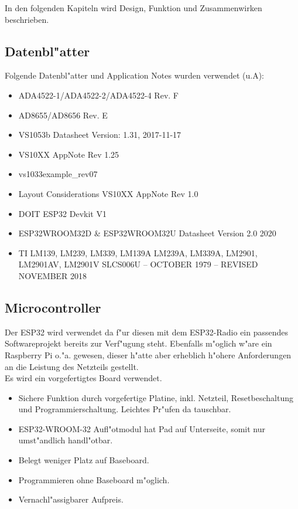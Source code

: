 \documentclass[ngerman,11pt,parskip=half] {scrartcl}
\begin{document}
In den folgenden Kapiteln wird Design, Funktion und Zusammenwirken beschrieben.

\subsection{Datenbl"atter} \label{sec:schaltung:datenblaetter}

Folgende Datenbl"atter und Application Notes wurden verwendet (u.A):
\begin{itemize}
\item ADA4522-1/ADA4522-2/ADA4522-4 Rev. F
\item AD8655/AD8656 Rev. E
\item VS1053b Datasheet Version: 1.31, 2017-11-17
\item VS10XX AppNote Rev 1.25
\item vs1033example\_rev07
\item Layout Considerations VS10XX AppNote Rev 1.0
\item DOIT ESP32 Devkit V1
\item ESP32­WROOM­32D \& ESP32­WROOM­32U Datasheet Version 2.0 2020
\item TI LM139, LM239, LM339, LM139A LM239A, LM339A, LM2901, LM2901AV, LM2901V  SLCS006U – OCTOBER 1979 – REVISED NOVEMBER 2018
\end{itemize}

\subsection{Microcontroller} \label{sec:schaltung:Microcontroller}

Der ESP32 wird verwendet da f"ur diesen mit dem ESP32-Radio ein passendes Softwareprojekt bereits zur Verf"ugung steht. Ebenfalls m"oglich w"are ein Raspberry Pi o."a. gewesen, dieser h"atte aber erheblich h"ohere Anforderungen an die Leistung des Netzteils gestellt.\\

Es wird ein vorgefertigtes Board verwendet.
\begin{itemize}
\item Sichere Funktion durch vorgefertige Platine, inkl. Netzteil, Resetbeschaltung und Programmierschaltung. Leichtes Pr"ufen da tauschbar.
\item ESP32-WROOM-32 Aufl"otmodul hat Pad auf Unterseite, somit nur umst"andlich handl"otbar.
\item Belegt weniger Platz auf Baseboard.
\item Programmieren ohne Baseboard m"oglich.
\item Vernachl"assigbarer Aufpreis.
\end{itemize}
\end{document}
